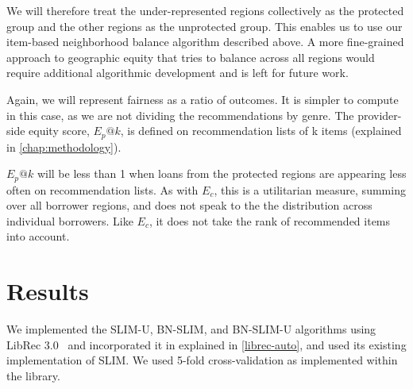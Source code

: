 
We will therefore treat the under-represented regions collectively as the protected group and the other regions as the unprotected group. This enables us to use our item-based neighborhood balance algorithm described above. A more fine-grained approach to geographic equity that tries to balance across all regions would require additional algorithmic development and is left for future work. 

Again, we will represent fairness as a ratio of outcomes. It is simpler to compute in this case, as we are not dividing the recommendations by genre. The provider-side equity score, $E_p@k$, is defined on recommendation lists of k items (explained in \ref{chap:methodology}). 




$E_p@k$ will be less than 1 when loans from the protected regions are appearing less often on recommendation lists. As with $E_c$, this is a utilitarian measure, summing over all borrower regions, and does not speak to the the distribution across individual borrowers. Like $E_c$, it does not take the rank of recommended items into account.


\section{Results}

We implemented the SLIM-U, BN-SLIM, and BN-SLIM-U algorithms using LibRec 3.0~\cite{guo2015librec} and incorporated it in \libauto{} explained in \ref{librec-auto}, and used its existing implementation of SLIM. We used 5-fold cross-validation as implemented within the library.

